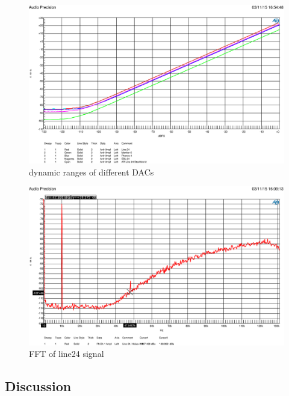 \documentclass[11pt]{report}
\begin{document}
\begin{figure}[htbp]
\begin{center}
\includegraphics[width=14cm,keepaspectratio=true]{Dynamikvergleich}
\caption{dynamic ranges of different DACs}
\label{Abb.:1}
\end{center}
\end{figure}

\begin{figure}[htbp]
\begin{center}
\includegraphics[width=14cm,keepaspectratio=true]{FFTrauschen}
\caption{FFT of line24 signal}
\label{Abb.:1}
\end{center}
\end{figure}

	\subsection{Discussion}


\end{document}
